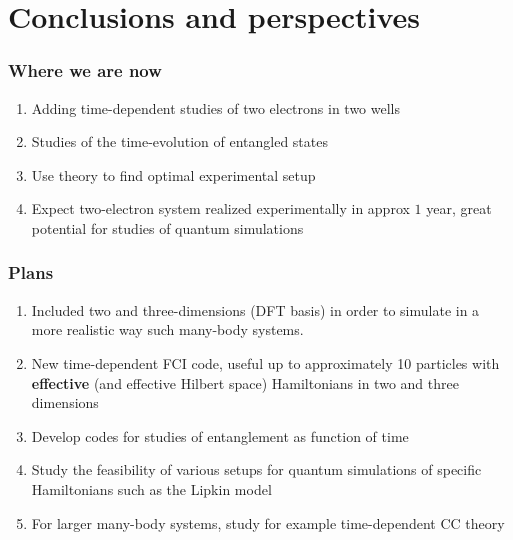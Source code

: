 \documentclass{beamer}
\begin{document}
\section{Conclusions and perspectives}

\begin{frame}
\frametitle{Where we are now}

\begin{enumerate}
\item Adding time-dependent studies of two electrons in two wells

\item Studies of the time-evolution of entangled states

\item Use theory to find optimal experimental setup

\item Expect two-electron system realized experimentally in approx $1$ year, great potential for studies of quantum simulations
\end{enumerate}

\noindent
\end{frame}

\begin{frame}
\frametitle{Plans}

\begin{enumerate}
\item Included  two and three-dimensions (DFT basis) in order to simulate in  a more realistic way such many-body systems.

\item New time-dependent FCI code, useful up to approximately 10 particles with \textbf{effective} (and effective Hilbert space) Hamiltonians in two and three dimensions

\item Develop codes for studies of entanglement as function of time


\item Study the feasibility of various setups for quantum simulations of specific Hamiltonians such as the Lipkin model

\item For larger many-body systems, study for example time-dependent CC theory
\end{enumerate}

\noindent
\end{frame}
\end{document}

